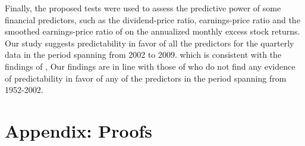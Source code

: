 \documentclass[harvard,11pt]{article}
\begin{document}
Finally, the proposed tests were used to assess the predictive power of some
financial predictors, such as the dividend-price ratio, earnings-price ratio and the smoothed earnings-price ratio of \citet{campbell1988dividend,campbell2001valuation} on the annualized monthly excess stock returns. Our study suggests predictability in favor of all the predictors for the quarterly data in the period spanning from 2002 to 2009. which is consistent with the findings of \citet{campbell2006efficient}, Our findings are in line with those of \citet{campbell2006efficient} who do not find any evidence of predictability in favor of any of the predictors in the period spanning from 1952-2002. 

\newpage

 

\newpage

\section{Appendix: Proofs \label{Appendix: ProofsC1}}
\end{document}
